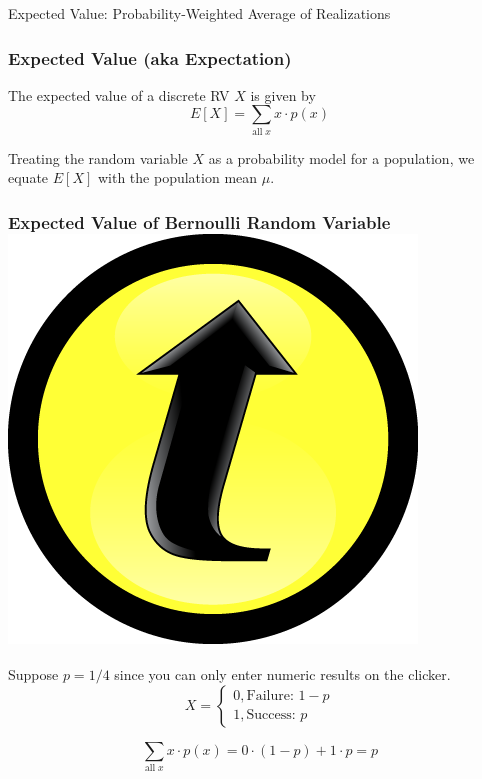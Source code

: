 \documentclass[handout]{beamer}
\begin{document}
\begin{frame}
\centering \Huge Expected Value: Probability-Weighted Average of Realizations

\end{frame}
\begin{frame}
\frametitle{Expected Value (aka Expectation)}
The expected value of a discrete RV $X$ is given by
	$$E[X] = \sum_{\mbox{all} \; x} x \cdot p(x)$$
	
 
	
	\vspace{2em}
\begin{alertblock}{Treating the random variable $X$ as a probability model for a population, we equate $E[X]$ with the population mean $\mu$.}\end{alertblock}
\end{frame}
\begin{frame}
\frametitle{Expected Value of Bernoulli Random Variable\hfill \includegraphics[scale = 0.05]{./images/clicker}}

Suppose $p = 1/4$ since you can only enter numeric results on the clicker.
$$X = \left\{ \begin{array}{l}  0, \mbox{Failure: } 1-p\\ 1, \mbox{Success: } p\end{array} \right.$$

\pause
\vspace{2em}
 
$$\sum_{\mbox{all} \; x} x \cdot p(x) = 0 \cdot (1-p) + 1 \cdot p = p$$
\end{frame}
\end{document}
